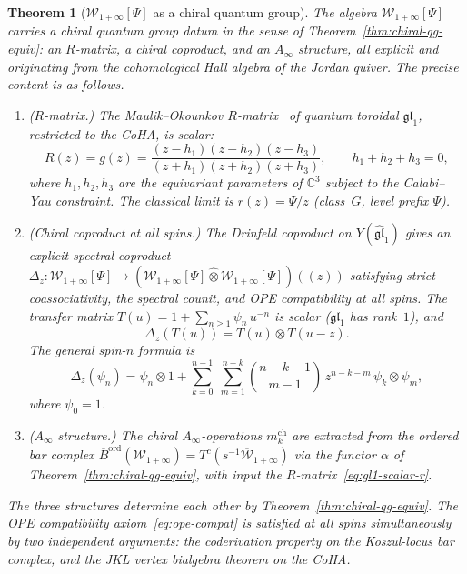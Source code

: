 \documentclass[11pt,reqno]{amsart}
\newtheorem{theorem}{Theorem}[section]
\theoremstyle{definition}
\theoremstyle{remark}
\newcommand{\cW}{\mathcal{W}}
\newcommand{\Ainf}{A_{\infty}}
\newcommand{\Barord}{\overline{B}^{\mathrm{ord}}}
\newcommand{\CC}{\mathbb{C}}
\numberwithin{equation}{section}
\begin{document}
\begin{theorem}[{$\cW_{1+\infty}[\Psi]$ as a chiral quantum
group}]
\label{thm:w-infty-chiral-qg}
The algebra $\cW_{1+\infty}[\Psi]$ carries a chiral quantum
group datum in the sense of
Theorem~\textup{\ref{thm:chiral-qg-equiv}}: an $R$-matrix,
a chiral coproduct, and an $\Ainf$ structure, all explicit
and originating from the cohomological Hall algebra of the
Jordan quiver. The precise content is as follows.
\begin{enumerate}[label=\textup{(\Roman*)}]
\item \textup{($R$-matrix.)}
  The Maulik--Okounkov $R$-matrix~\cite{MO19} of quantum
  toroidal $\mathfrak{gl}_1$, restricted to the CoHA, is
  \emph{scalar}:
  \begin{equation}\label{eq:gl1-scalar-r}
    R(z) = g(z)
    = \frac{(z - h_1)(z - h_2)(z - h_3)}
    {(z + h_1)(z + h_2)(z + h_3)},
    \qquad h_1 + h_2 + h_3 = 0,
  \end{equation}
  where $h_1, h_2, h_3$ are the equivariant parameters of
  $\CC^3$ subject to the Calabi--Yau constraint. The
  classical limit is
  $r(z) = \Psi/z$ \textup{(}class~$G$, level prefix
  $\Psi$\textup{)}.
\item \textup{(Chiral coproduct at all spins.)}
  The Drinfeld coproduct on $Y(\widehat{\mathfrak{gl}}_1)$
  gives an explicit spectral coproduct
  $\Delta_z \colon \cW_{1+\infty}[\Psi] \to
  (\cW_{1+\infty}[\Psi] \mathbin{\hat{\otimes}}
  \cW_{1+\infty}[\Psi])((z))$
  satisfying strict coassociativity,
  the spectral counit, and OPE compatibility at all spins.
  The transfer matrix
  $T(u) = 1 + \sum_{n \geq 1} \psi_n\, u^{-n}$
  is scalar \textup{(}$\mathfrak{gl}_1$ has
  rank~$1$\textup{)}, and
  \begin{equation}\label{eq:gl1-drinfeld-coprod}
    \Delta_z(T(u))
    = T(u) \otimes T(u - z).
  \end{equation}
  The general spin-$n$ formula is
  \begin{equation}\label{eq:gl1-coprod-general}
    \Delta_z(\psi_n)
    = \psi_n \otimes 1
    + \sum_{k=0}^{n-1}\; \sum_{m=1}^{n-k}
    \binom{n-k-1}{m-1}\,
    z^{n-k-m}\,
    \psi_k \otimes \psi_m,
  \end{equation}
  where $\psi_0 = 1$.
\item \textup{($\Ainf$ structure.)}
  The chiral $\Ainf$-operations $m_k^{\mathrm{ch}}$ are
  extracted from the ordered bar complex
  $\Barord(\cW_{1+\infty})
  = T^c(s^{-1}\overline{\cW}_{1+\infty})$ via the functor
  $\alpha$ of Theorem~\textup{\ref{thm:chiral-qg-equiv}},
  with input the $R$-matrix~\eqref{eq:gl1-scalar-r}.
\end{enumerate}
The three structures determine each other by
Theorem~\textup{\ref{thm:chiral-qg-equiv}}. The OPE
compatibility axiom~\eqref{eq:ope-compat} is satisfied at
all spins simultaneously by two independent arguments:
the coderivation property on the Koszul-locus bar complex,
and the JKL vertex bialgebra theorem on the CoHA.
\end{theorem}
\end{document}
